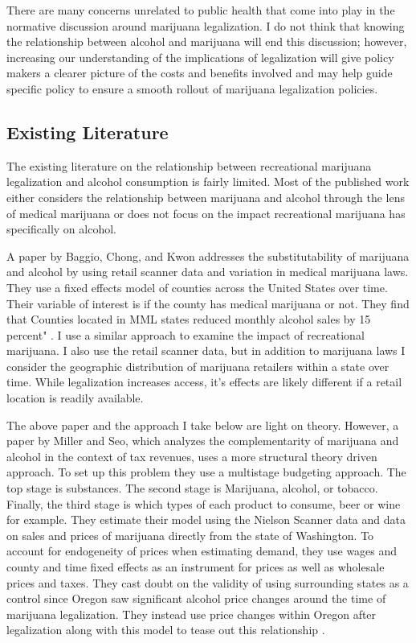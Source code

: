 \documentclass[11pt]{article}
\begin{document}
There are many concerns unrelated to public health that come into play in the normative discussion around marijuana legalization. I do not think that knowing the relationship between alcohol and marijuana will end this discussion; however, increasing our understanding of the implications of legalization will give policy makers a clearer picture of the costs and benefits involved and may help guide specific policy to ensure a smooth rollout of marijuana legalization policies.




\subsection{Existing Literature}

The existing literature on the relationship between recreational marijuana legalization and alcohol consumption is fairly limited. Most of the published work either considers the relationship between marijuana and alcohol through the lens of medical marijuana or does not focus on the impact recreational marijuana has specifically on alcohol.\par 


A paper by Baggio, Chong, and Kwon addresses the substitutability of marijuana and alcohol by using retail scanner data and variation in medical marijuana laws. They use a fixed effects model of counties across the United States over time. Their variable of interest is if the county has medical marijuana or not. They find that Counties located in MML states reduced monthly alcohol sales by 15 percent" \cite{baggio_chong_kwon_2018}. I use a similar approach to examine the impact of recreational marijuana. I also use the retail scanner data, but in addition to marijuana laws I consider the geographic distribution of marijuana retailers within a state over time. While legalization increases access, it's effects are likely different if a retail location is readily available. \par


The above paper and the approach I take below are light on theory. However, a paper by Miller and Seo, which analyzes the complementarity of marijuana and alcohol in the context of tax revenues, uses a more structural theory driven approach. To set up this problem they use a multistage budgeting approach. The top stage is substances. The second stage is Marijuana, alcohol, or tobacco. Finally, the third stage is which types of each product to consume, beer or wine for example. They estimate their model using the Nielson Scanner data and data on sales and prices of marijuana directly from the state of Washington. To account for endogeneity of prices when estimating demand, they use wages and county and time fixed effects as an instrument for prices as well as wholesale prices and taxes.  They cast doubt on the validity of using surrounding states as a control since Oregon saw significant alcohol price changes around the time of marijuana legalization. They instead use price changes within Oregon after legalization along with this model to tease out this relationship \cite{miller_seo_2018}. \par
\end{document}
